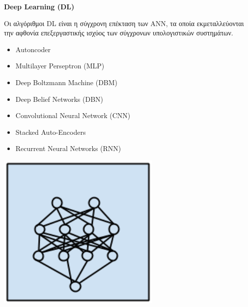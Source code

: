 \begin{minipage}{0.5\textwidth}

  \textbf{\large Deep Learning (DL)}

  Οι αλγόριθμοι DL είναι η σύγχρονη επέκταση των ANN, τα οποία
  εκμεταλλεύονται την αφθονία επεξεργαστικής ισχύος των σύγχρονων υπολογιστικών συστημάτων.
  \begin{itemize}
    \setlength\itemsep{0em}
    \item{Autoncoder}
    \item{Multilayer Perseptron (MLP)}
    \item{Deep Boltzmann Machine (DBM)}
    \item{Deep Belief Networks (DBN)}
    \item{Convolutional Neural Network (CNN)}
    \item{Stacked Auto-Encoders}
    \item{Recurrent Neural Networks (RNN)}
  \end{itemize}%
\end{minipage}
\begin{minipage}{0.5\textwidth}
  \begin{center}
    \includegraphics[width=0.6\textwidth]{./images/chapter3/deep_learning_algorithms.png}
  \end{center}
\end{minipage}
\\\\

